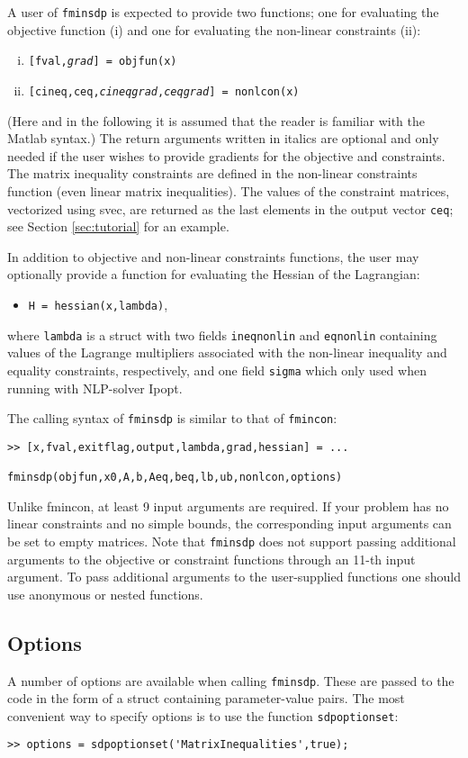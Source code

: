 \documentclass{article}
\newcommand{\svec}{\mbox{\textsf{svec}}}
\begin{document}
A user of \texttt{fminsdp} is expected to provide two functions; one for evaluating the objective function (i) and one for evaluating the non-linear constraints (ii):
\begin{enumerate}[i.]
\item \texttt{[fval,\textit{grad}] = objfun(x)}
\item \texttt{[cineq,ceq,\textit{cineqgrad},\textit{ceqgrad}] = nonlcon(x)}
\end{enumerate}
(Here and in the following it is assumed that the reader is familiar with the Matlab syntax.) The return arguments written in italics are optional and only needed if the user wishes to provide gradients for the objective and constraints. The matrix inequality constraints are defined in the non-linear constraints function (even linear matrix inequalities). The values of the constraint matrices, vectorized using \svec, are returned as the last elements in the output vector \texttt{ceq}; see Section \ref{sec:tutorial} for an example.

In addition to objective and non-linear constraints functions, the user may optionally provide a function for evaluating
the Hessian of the Lagrangian:
\begin{itemize}
\item \texttt{H = hessian(x,lambda)},
\end{itemize}
where \texttt{lambda} is a struct with two fields \texttt{ineqnonlin} and \texttt{eqnonlin} containing values of the Lagrange
multipliers associated with the non-linear inequality and equality constraints, respectively, and one field \texttt{sigma} 
which only used when running with NLP-solver Ipopt.

The calling syntax of \texttt{fminsdp} is similar to that of \texttt{fmincon}:
\begin{verbatim}
>> [x,fval,exitflag,output,lambda,grad,hessian] = ...
										                        fminsdp(objfun,x0,A,b,Aeq,beq,lb,ub,nonlcon,options)
\end{verbatim}
Unlike fmincon, at least 9 input arguments are required. If your problem has no linear constraints and no simple
bounds, the corresponding input arguments can be set to empty matrices. Note that \texttt{fminsdp} does not
support passing additional arguments to the objective or constraint functions through an 11-th input argument. 
To pass additional arguments to the user-supplied functions one should use anonymous or nested functions.

\subsection{Options}
\label{sec:options}
A number of options are available when calling \texttt{fminsdp}. These are passed to the code in the form of a struct containing
parameter-value pairs. The most convenient way to specify options is to use the function \texttt{sdpoptionset}:
\begin{verbatim}
>> options = sdpoptionset('MatrixInequalities',true);
\end{verbatim}
\end{document}
